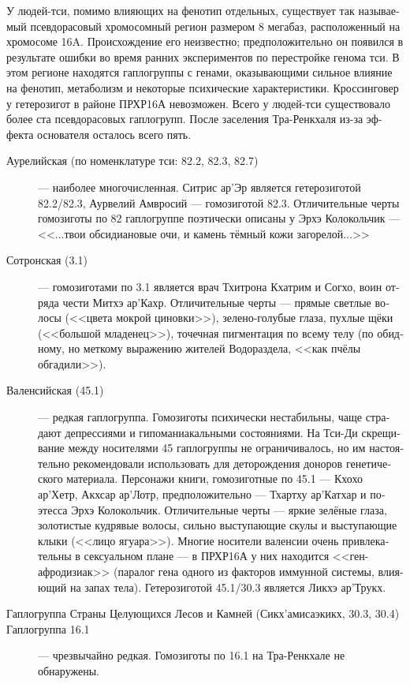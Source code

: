 \documentclass[a4paper,12pt,fleqn]{book}\usepackage{polyglossia}\setdefaultlanguage[babelshorthands=true]{russian}\setotherlanguage{english}\defaultfontfeatures{Ligatures=TeX,Mapping=tex-text}\usepackage{xcolor}\newcommand{\ml}[3]{#2}
\begin{document}
У людей-тси, помимо влияющих на фенотип отдельных, существует так называемый псевдорасовый хромосомный регион размером 8 мегабаз, расположенный на хромосоме 16A.
Происхождение его неизвестно;
предположительно он появился в результате ошибки во время ранних экспериментов по перестройке генома тси.
В этом регионе находятся гаплогруппы с генами, оказывающими сильное влияние на фенотип, метаболизм и некоторые психические характеристики.
Кроссинговер у гетерозигот в районе ПРХР16А невозможен.
Всего у людей-тси существовало более ста псевдорасовых гаплогрупп.
После заселения Тра-Ренкхаля из-за эффекта основателя осталось всего пять.

\begin{description}
\item[Аурелийская (по номенклатуре тси: 82.2, 82.3, 82.7)] --- наиболее многочисленная.
Ситрис ар'Эр является гетерозиготой 82.2/82.3, Аурвелий Амвросий --- гомозиготой 82.3.
Отличительные черты гомозиготы по 82 гаплогруппе поэтически описаны у Эрхэ Колокольчик --- <<...твои обсидиановые очи, и камень тёмный кожи загорелой...>>
\item[Сотронская (3.1)] --- гомозиготами по 3.1 является врач Тхитрона Кхатрим и Согхо, воин отряда чести Митхэ ар'Кахр.
Отличительные черты --- прямые светлые волосы (<<цвета мокрой циновки>>), зелено-голубые глаза, пухлые щёки (<<большой младенец>>), точечная пигментация по всему телу (по обидному, но меткому выражению жителей Водораздела, <<как пчёлы обгадили>>).
\item[Валенсийская (45.1)] --- редкая гаплогруппа.
Гомозиготы психически нестабильны, чаще страдают депрессиями и гипоманиакальными состояниями.
На Тси-Ди скрещивание между носителями 45 гаплогруппы не ограничивалось, но им настоятельно рекомендовали использовать для деторождения доноров генетического материала.
Персонажи книги, гомозиготные по 45.1 --- Кхохо ар'Хетр, Акхсар ар'Лотр, предположительно --- Тхартху ар'Катхар и поэтесса Эрхэ Колокольчик.
Отличительные черты --- яркие зелёные глаза, золотистые кудрявые волосы, сильно выступающие скулы и выступающие клыки (<<лицо ягуара>>).
Многие носители валенсии очень привлекательны в сексуальном плане --- в ПРХР16А у них находится <<ген-афродизиак>> (паралог гена одного из факторов иммунной системы, влияющий на запах тела).
Гетерозиготой 45.1/30.3 является Ликхэ ар'Трукх.
\item[Гаплогруппа Страны Целующихся Лесов и Камней (Сикх'амисаэкикх, 30.3, 30.4)]
\item[Гаплогруппа 16.1] --- чрезвычайно редкая.
Гомозиготы по 16.1 на Тра-Ренкхале не обнаружены.
\end{description}
\end{document}

